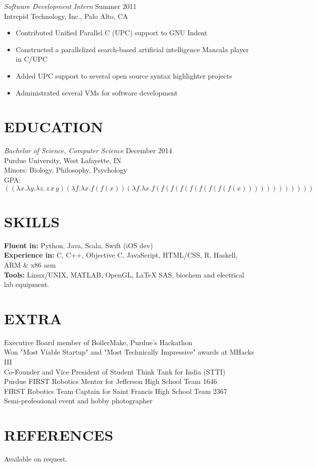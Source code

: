 \documentclass[margin,5pt]{res} %
\begin{document}
\begin{resume}
	{\sl Software Development Intern} \hfill Summer 2011\\
          Intrepid Technology, Inc., Palo Alto, CA
          \begin{itemize}  \itemsep -2pt
		\item Contributed Unified Parallel C (UPC) support to GNU Indent
		\item Constructed a parallelized search-based artificial intelligence Mancala player in C/UPC
		\item Added UPC support to several open source syntax highlighter projects
		\item Administrated several VMs for software development
		\end{itemize}


\section{EDUCATION}
	{\sl Bachelor of Science, Computer Science }\hfill  December 2014\\
		Purdue University, West Lafayette, IN\\
		Minors: Biology, Philosophy, Psychology \\
		GPA: $ ((\lambda x . \lambda y . \lambda z . \, z \, x \, y) (\lambda f . \lambda x . f(f(x)) (\lambda f . \lambda x . f(f(f(f(f(f(f(f(f(x))))))))))))   $


\section{SKILLS} 
	{\bf Fluent in:} Python, Java, Scala, Swift (iOS dev)\\
 	{\bf Experience in:} C, C++, Objective C, JavaScript, HTML/CSS, R, Haskell, ARM \& x86 asm\\
	{\bf Tools:} Linux/UNIX, MATLAB, OpenGL, LaTeX SAS, biochem and electrical lab equipment.


\section{EXTRA}       
	Executive Board member of BoilerMake, Purdue's Hackathon\\
	Won "Most Viable Startup" and "Most Technically Impressive" awards at MHacks III\\
	Co-Founder and Vice President of Student Think Tank for India (STTI) \\
     Purdue FIRST Robotics Mentor for Jefferson High School Team 1646\\
	FIRST Robotics Team Captain for Saint Francis High School Team 2367\\
     Semi-professional event and hobby photographer

\section{REFERENCES}Available on request.

\end{resume}
\end{document}
